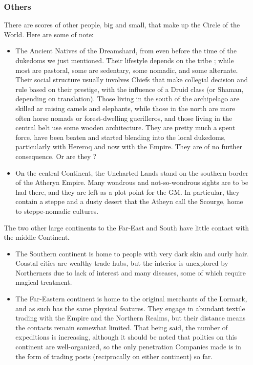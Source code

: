 \subsubsection{Others}

There are scores of other people, big and small, that make up the Circle of the World. Here are some of note:

\begin{itemize}
    \item The Ancient Natives of the Dreamshard, from even before the time of the dukedoms we just mentioned.
    Their lifestyle depends on the tribe ; while most are pastoral, some are sedentary, some nomadic, and some alternate. Their social structure usually involves Chiefs that make collegial decision and rule based on their prestige, with the influence of a Druid class (or Shaman, depending on translation). Those living in the south of the archipelago are skilled ar raising camels and elephants, while those in the north are more often horse nomads or forest-dwelling guerilleros, and those living in the central belt use some wooden architecture. They are pretty much a spent force, have been beaten and started blending into the local dukedoms, particularly with Hereroq and now with the Empire. They are of no further consequence. Or are they ?
    \item On the central Continent, the Uncharted Lands stand on the southern border of the Atheryn Empire. Many wondrous and not-so-wondrous sights are to be had there, and they are left as a plot point for the GM. In particular, they contain a steppe and a dusty desert that the Atheyn call the Scourge, home to steppe-nomadic cultures.
\end{itemize}

The two other large continents to the Far-East and South have little contact with the middle Continent.

\begin{itemize}
    \item The Southern continent is home to people with very dark skin and curly hair. Coastal cities are wealthy trade hubs, but the interior is unexplored by Northerners due to lack of interest and many diseases, some of which require magical treatment.
    \item The Far-Eastern continent is home to the original merchants of the Lormark, and as such has the same physical features. They engage in abundant textile trading with the Empire and the Northern Realms, but their distance means the contacts remain somewhat limited. That being said, the number of expeditions is increasing, although it should be noted that polities on this continent are well-organized, so the only penetration Companies made is in the form of trading posts (reciprocally on either continent) so far.
\end{itemize}




